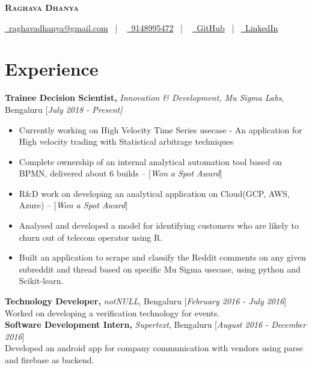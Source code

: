 \documentclass[10pt]{article}
\renewcommand{\textbf}[1]{{\bfseries\color{accent_darkest}#1}}
\begin{document}
\thispagestyle{empty}


\begin{center}
 \textbf{\textsc{\color{anotherred}\Huge Raghava Dhanya}}\\[10pt] %
\end{center}

\begin{center}
 \href{mailto:raghavadhanya@gmail.com}{\faEnvelope\ raghavadhanya@gmail.com}
 \ | \ %
 \href{tel:9148995472}{\faPhoneSquare\ 9148995472} \ | \ %
 \href{https://github.com/RaghavaDhanya}{ \underline{\faGithubSquare\
 GitHub}} \ | \ \href{https://in.linkedin.com/in/raghavadhanya}{\underline
 {\faLinkedinSquare\ LinkedIn}} 
\end{center}


\section*{Experience} 
\textbf{Trainee Decision Scientist,} \textit{Innovation \& Development, Mu Sigma Labs},
 Bengaluru \hfill \textcolor{grey_darker}{[\textit{July 2018 - Present]}}
\begin{itemize}
    \itemsep0em
    \item Currently working on High Velocity Time Series usecase - An application for High velocity trading with Statistical arbitrage techniques 
    \item Complete ownership of an internal analytical automation tool based on BPMN, delivered about 6 builds  -- [\textit{Won a Spot Award}] 
    \item R\&D work on developing an analytical application on Cloud(GCP, AWS, Azure) -- [\textit{Won a Spot Award}]
    \item Analysed and developed a model for identifying customers who are likely to churn out of telecom operator
    using R.
    \item Built an application to scrape and classify the Reddit comments on any given subreddit and thread based
    on specific Mu Sigma usecase, using python and Scikit-learn.
\end{itemize}
\textbf{Technology Developer,} \textit{notNULL},
Bengaluru \hfill \textcolor{grey_darker}{[\textit{February 2016 - July 2016}]}\\
Worked on developing a verification technology for events.
\medskip
\\
\textbf{Software Development Intern,} \textit{Supertext}, Bengaluru
\hfill \textcolor{grey_darker}{[\textit{August 2016 - December 2016}]}\\
Developed an android app for company communication with vendors using
parse and firebase as backend. 
\end{document}
